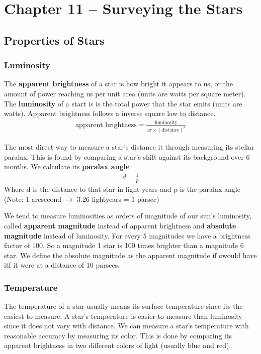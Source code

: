 \section{Chapter 11 -- Surveying the Stars}
\subsection{Properties of Stars}
\subsubsection{Luminosity}
The \textbf{apparent brightness} of a star is how bright it appears to us, or the amount of power reaching us per unit area (units are watts per square meter). The \textbf{luminosity} of a start is is the total power that the star emits (units are watts). Apparent brightness follows a inverse square law to distance.
\begin{align*}
    \text{apparent brightness} = \frac{\text{luminosity}}{4\pi \times (\text{distance})^2}
\end{align*}

The most direct way to measure a star's distance it through measuring its stellar paralax. This is found by comparing a star's shift against its background over 6 months. We calculate its \textbf{paralax angle}
\begin{align*}
    d = \frac{1}{p}
\end{align*}
Where d is the distance to that star in light years and p is the paralax angle (Note: 1 arcsecond $\rightarrow$ 3.26 lightyears = 1 parsec)

We tend to measure luminosities as orders of magnitude of our sun's luminosity, called \textbf{apparent magnitude} instead of apparent brightness and \textbf{absolute magnitude} instead of luminosity. For every 5 magnitudes we have a brightness factor of 100. So a magnitude 1 star is 100 times brighter than a magnitude 6 star. We define the absolute magnitude as the apparent magnitude if owould have itf it were at a distance of 10 parsecs.

\subsubsection{Temperature}
The temperature of a star usually means its surface temperature since its the easiest to measure. A star's temperature is easier to measure than luminosity since it does not vary with distance. We can measure a star's temperature with reasonable accuracy by measuring its color. This is done by comparing its apparent brightness in two different colors of light (usually blue and red).

